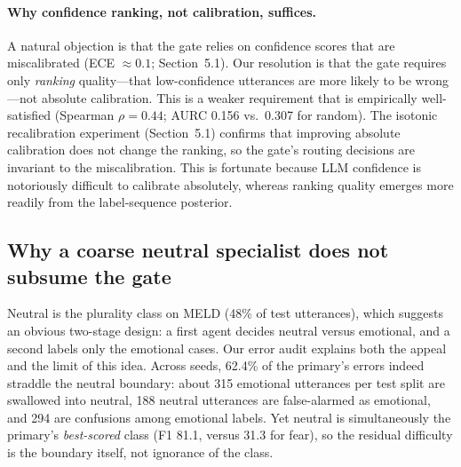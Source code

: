 \documentclass[final,5p,times,twocolumn]{elsarticle}
\begin{document}
\paragraph{Why confidence ranking, not calibration, suffices.}
A natural objection is that the gate relies on confidence scores that are
miscalibrated (ECE $\approx0.1$; Section~5.1). Our resolution is that the
gate requires only \emph{ranking} quality---that low-confidence utterances
are more likely to be wrong---not absolute calibration. This is a weaker
requirement that is empirically well-satisfied (Spearman $\rho=0.44$;
AURC 0.156 vs.\ 0.307 for random). The isotonic recalibration experiment
(Section~5.1) confirms that improving absolute calibration does not change
the ranking, so the gate's routing decisions are invariant to the
miscalibration. This is fortunate because LLM confidence is notoriously
difficult to calibrate absolutely, whereas ranking quality emerges more
readily from the label-sequence posterior.

\subsection{Why a coarse neutral specialist does not subsume the gate}
\label{sec:neutral}
Neutral is the plurality class on MELD (48\% of test utterances), which
suggests an obvious two-stage design: a first agent decides neutral versus
emotional, and a second labels only the emotional cases. Our error audit
explains both the appeal and the limit of this idea. Across seeds, 62.4\%
of the primary's errors indeed straddle the neutral boundary: about 315
emotional utterances per test split are swallowed into neutral, 188 neutral
utterances are false-alarmed as emotional, and 294 are confusions among
emotional labels. Yet neutral is simultaneously the primary's
\emph{best-scored} class (F1 81.1, versus 31.3 for fear), so the residual
difficulty is the boundary itself, not ignorance of the class.
\end{document}
